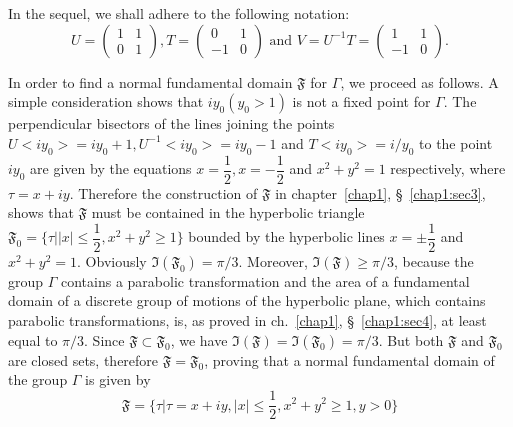 In the sequel, we shall adhere to the following notation:
$$
U = \begin{pmatrix}
1&1\\
0&1
\end{pmatrix}, T = \begin{pmatrix}
0&1\\
-1&0
\end{pmatrix} \text{ and } V = U^{-1} T  =
\begin{pmatrix}
1&1\\
-1&0
\end{pmatrix}.
$$

In order to find a normal fundamental domain $\mathfrak{F}$ for
$\Gamma$, we proceed as follows. A simple consideration shows that
$iy_0(y_0>1)$ is not a fixed point for $\Gamma$. The perpendicular
bisectors of the lines joining the points $U<iy_0>=iy_0+1,
U^{-1}<iy_0>=iy_0-1$ and $T<iy_0>=i/y_0$ to the point $iy_0$ are given
by the equations $x=\dfrac{1}{2}, x=-\dfrac{1}{2}$ and $x^2+y^2=1$
respectively, where $\tau =x+iy$. Therefore the construction of
$\mathfrak{F}$ in chapter~\ref{chap1}, \S~\ref{chap1:sec3}, 
shows that $\mathfrak{F}$ must be
contained in the hyperbolic triangle $\mathfrak{F}_0 = \{\tau \big| |x|
\leq \dfrac{1}{2}, x^2+y^2\geq 1\}$ bounded by the hyperbolic lines
$x=\pm \dfrac{1}{2}$ and \pageoriginale $x^2+y^2=1$. Obviously
$\mathfrak{I}(\mathfrak{F}_0) = \pi/3$. Moreover,
$\mathfrak{I}(\mathfrak{F})\geq \pi/3$, because the group $\Gamma$
contains a parabolic transformation and the area of a fundamental
domain of a discrete group of motions of the hyperbolic plane, which
contains parabolic transformations, is, as proved in ch.~\ref{chap1}, 
\S~\ref{chap1:sec4}, at
least equal to $\pi/3$. Since $\mathfrak{F} \subset \mathfrak{F}_0$,
we have $\mathfrak{I}(\mathfrak{F}) = \mathfrak{I}(\mathfrak{F}_0) =
\pi/3$. But both $\mathfrak{F}$ and $\mathfrak{F}_0$ are closed sets,
therefore $\mathfrak{F}=\mathfrak{F}_0$, proving that a normal
fundamental domain of the group $\Gamma$ is given by 
\begin{equation*}
\mathfrak{F} = \{\tau|\tau = x + iy, |x| \leq \frac{1}{2}, x^2+y^2
\geq 1, y >0\} \tag{1}\label{c2:eq1:1}
\end{equation*}

